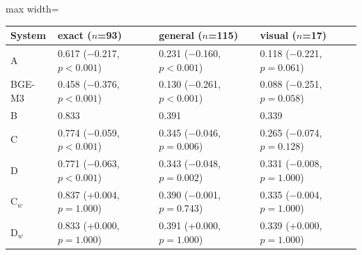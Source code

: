 \begin{adjustbox}{max width=\linewidth}
\begin{tabular}{llll}
\toprule
System & exact ($n$=93) & general ($n$=115) & visual ($n$=17) \\
\midrule
A & 0.617 ($-$0.217, $p<0.001$) & 0.231 ($-$0.160, $p<0.001$) & 0.118 ($-$0.221, $p=0.061$) \\
BGE-M3 & 0.458 ($-$0.376, $p<0.001$) & 0.130 ($-$0.261, $p<0.001$) & 0.088 ($-$0.251, $p=0.058$) \\
B & 0.833 & 0.391 & 0.339 \\
C & 0.774 ($-$0.059, $p<0.001$) & 0.345 ($-$0.046, $p=0.006$) & 0.265 ($-$0.074, $p=0.128$) \\
D & 0.771 ($-$0.063, $p<0.001$) & 0.343 ($-$0.048, $p=0.002$) & 0.331 ($-$0.008, $p=1.000$) \\
C$_w$ & 0.837 (+0.004, $p=1.000$) & 0.390 ($-$0.001, $p=0.743$) & 0.335 ($-$0.004, $p=1.000$) \\
D$_w$ & 0.833 (+0.000, $p=1.000$) & 0.391 (+0.000, $p=1.000$) & 0.339 (+0.000, $p=1.000$) \\
\bottomrule
\end{tabular}
\end{adjustbox}
\par{}
